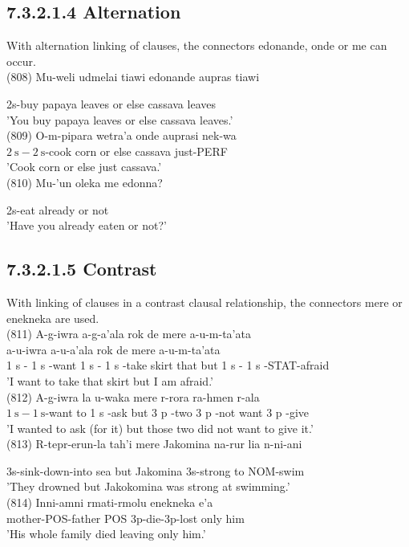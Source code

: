 \documentclass[10pt]{article}
\begin{document}
\subsection*{7.3.2.1.4 Alternation}
With alternation linking of clauses, the connectors edonande, onde or me can occur.\\
(808) Mu-weli udmelai tiawi edonande aupras tiawi

2s-buy papaya leaves or else cassava leaves\\
'You buy papaya leaves or else cassava leaves.'\\
(809) O-m-pipara wetra'a onde auprasi nek-wa\\
\(2 \mathrm{~s}-2 \mathrm{~s}\)-cook corn or else cassava just-PERF\\
'Cook corn or else just cassava.'\\
(810) Mu-'un oleka me edonna?

2s-eat already or not\\
'Have you already eaten or not?'

\subsection*{7.3.2.1.5 Contrast}
With linking of clauses in a contrast clausal relationship, the connectors mere or enekneka are used.\\
(811) A-g-iwra a-g-a'ala rok de mere a-u-m-ta'ata\\
a-u-iwra a-u-a'ala rok de mere a-u-m-ta'ata\\
1 s - 1 s -want 1 s - 1 s -take skirt that but 1 s - 1 s -STAT-afraid\\
'I want to take that skirt but I am afraid.'\\
(812) A-g-iwra la u-waka mere r-rora ra-hmen r-ala\\
\(1 \mathrm{~s}-1 \mathrm{~s}\)-want to 1 s -ask but 3 p -two 3 p -not want 3 p -give\\
'I wanted to ask (for it) but those two did not want to give it.'\\
(813) R-tepr-erun-la tah'i mere Jakomina na-rur lia n-ni-ani

3s-sink-down-into sea but Jakomina 3s-strong to NOM-swim\\
'They drowned but Jakokomina was strong at swimming.'\\
(814) Inni-amni rmati-rmolu enekneka e'a\\
mother-POS-father POS 3p-die-3p-lost only him\\
'His whole family died leaving only him.'
\end{document}
